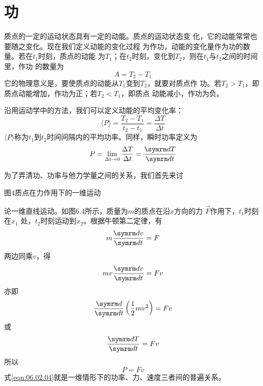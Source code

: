 \section{功}\label{sec:06.02}

质点的一定的运动状态具有一定的动能。质点的运动状态变
化，它的动能常常也要随之变化。现在我们定义动能的变化过程
为作功，动能的变化量作为功的数量。若在$ t_1 $时刻，质点的动能
为$ T _ { 1 } $；在$ t_2 $时刻，变化到$ T_2 $，则在$ t _ { 1 } $与$ t _ { 2 } $之间的时间里，作功
的数量为
\begin{equation}\label{eqn:06.02.01}
 A = T _ { 2 } - T _ { 1 }
\end{equation}
它的物理意义是，要使质点的动能从$ T_1 $变到$ T_2 $，就要对质点作
功。若$ T _ { 2 } > T _ { 1 } $，即质点动能增加，作功为正；若$ T _ { 2 } < T _ { 1 } $，即质点
动能减小，作功为负。

沿用运动学中的方法，我们可以定义动能的平均变化率：
\begin{equation}\label{eqn:06.02.02}
 \langle P \rangle = \frac { T _ { 2 } - T _ { 1 } } { t _ { 2 } - t _ { 1 } } = \frac { \Delta T } { \Delta t }
\end{equation}
$ \langle P \rangle $称为$ t _ { 1 } $到$ t _ { 2 } $时间间隔内的平均功率。同样，瞬时功率定义为
\begin{equation}\label{eqn:06.02.03}
 P = \lim _ { \Delta t \to 0 } \frac { \Delta T } { \Delta t } = \frac { \dif T } { \dif t }
\end{equation}

为了弄清功、功率与他力学量之间的关系，我们首先来讨

图4质点在力作用下的一维运动

论一维直线运动。如图6.4所示，质量为$ m $的质点在沿$ x $方向的力
$ \vec{F} $作用下，$ t _ { 1 } $时刻在$ x _ { 1 } $ 处，$ t _ { 2 } $时刻运动到$ x _ 2 $。根据牛顿第二定律，有
\begin{equation*}
 m \frac { \dif v } { \dif t } = F
\end{equation*}
两边同乘$ v $，得
\begin{equation*}
 m v \frac { \dif v } { \dif t } = F v
\end{equation*}
亦即
\begin{equation*}
 \frac { \dif } { \dif t } \left( \frac { 1 } { 2 } m v ^ { 2 } \right) = F v
\end{equation*}
或
\begin{equation*}
 \frac { \dif T } { \dif t } = F v
\end{equation*}
所以
\begin{equation}\label{eqn:06.02.04}
 P = F v
\end{equation}
式\eqref{eqn:06.02.04}就是一维情形下的功率、力、速度三者间的普遍关系。

